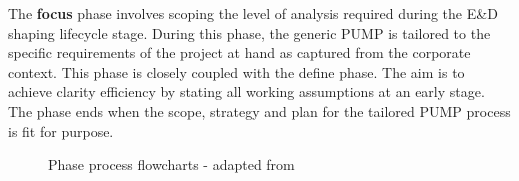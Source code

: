 The \textbf{focus} phase involves scoping the level of analysis required during the E\&D shaping lifecycle stage.
During this phase, the generic PUMP is tailored to the specific requirements of the project at hand as captured from the corporate context.
This phase is closely coupled with the define phase.
The aim is to achieve clarity efficiency by stating all working assumptions at an early stage.
The phase ends when the scope, strategy and plan for the tailored PUMP process is fit for purpose.

\begin{figure}[!h]
  \centering
{} \quad
{}
\caption{Phase process flowcharts - adapted from \cite{chapman}}
\label{Figure:DefineFocus}
\end{figure}

